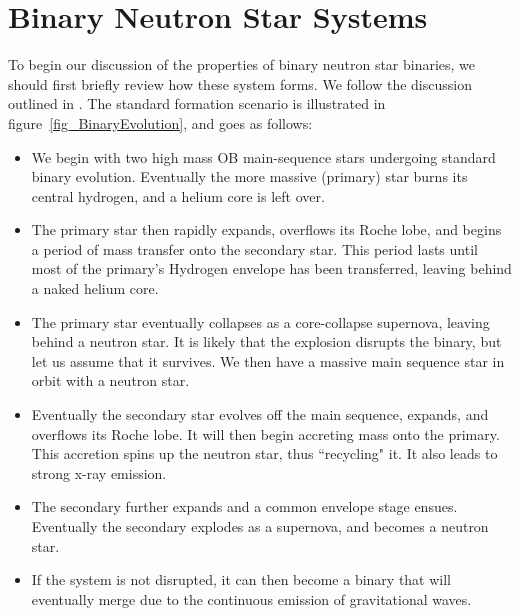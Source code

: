 \section{Binary Neutron Star Systems}
\label{sec:BNS}

To begin our discussion of the properties of binary neutron star binaries, we should first briefly review how these system forms. We follow the discussion outlined in \cite{Postnov:2014tza}. The standard formation scenario is illustrated in figure~\ref{fig_BinaryEvolution}, and goes as follows:

\begin{itemize}

\item We begin with two high mass OB main-sequence stars undergoing standard binary evolution. Eventually the more massive (primary) star burns its central hydrogen, and a helium core is left over. 

\item The primary star then rapidly expands, overflows its Roche lobe, and begins a period of mass transfer onto the secondary star. This period lasts until most of the primary's Hydrogen envelope has been transferred, leaving behind a naked helium core.

\item The primary star eventually collapses as a core-collapse supernova, leaving behind a neutron star. It is likely that the explosion disrupts the binary, but let us assume that it survives. We then have a massive main sequence star in orbit with a neutron star.

\item Eventually the secondary star evolves off the main sequence, expands, and overflows its Roche lobe. It will then begin accreting mass onto the primary. This accretion spins up the neutron star, thus ``recycling" it. It also leads to strong x-ray emission.

\item The secondary further expands and a common envelope stage ensues. Eventually the secondary explodes as a supernova, and becomes a neutron star.

\item If the system is not disrupted, it can then become a binary that will eventually merge due to the continuous emission of gravitational waves.

\end{itemize}

